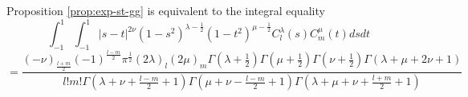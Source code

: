 \documentclass[pdf,notes]{beamer}
\newenvironment{taggedprop}[1]
 {\renewcommand\thetaggedpropx{#1}\taggedpropx}
  {\endtaggedpropx}
\begin{document}
\begin{frame}
	Proposition \ref{prop:exp-st-gg} is equivalent to the integral equality
	\begin{taggedprop}{$\;1'$}
		\label{prop:int-st-gg}
		\begin{equation*}
			\int_{- 1}^1 \int_{- 1}^1 | s - t |^{2 \nu} (1 - s^2)^{\lambda - \frac{1}{2}}
			(1 - t^2)^{\mu - \frac{1}{2}} C_l^{\lambda} (s) C_m^{\mu} (t) d s d t
		\end{equation*}
		{\scriptsize
		\begin{equation}
			=\frac{(- \nu)_{\frac{l + m}{2}} (- 1)^{\frac{l - m}{2}} \pi^{\frac{1}{2}} (2
			\lambda)_l (2 \mu)_m \Gamma \left( \lambda + \frac{1}{2} \right) \Gamma \left(
			\mu + \frac{1}{2} \right) \Gamma \left( \nu + \frac{1}{2} \right) \Gamma
		(\lambda + \mu + 2 \nu + 1)}{l!m! \Gamma \left( \lambda + \nu + \frac{l -
		m}{2} + 1 \right) \Gamma \left( \mu + \nu - \frac{l - m}{2} + 1 \right) \Gamma
		\left( \lambda + \mu + \nu + \frac{l + m}{2} + 1 \right)}
			\label{eqn:int-st-gg}
			\tag{1$'$}
		\end{equation}
		}
	\end{taggedprop}
\end{frame}
\end{document}
